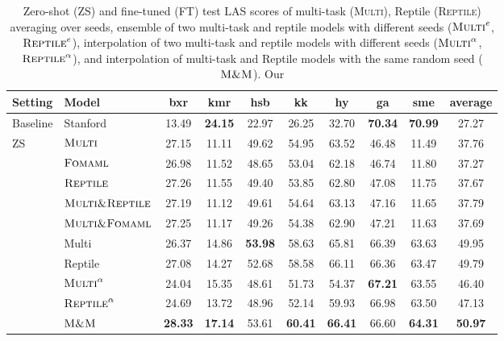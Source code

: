 \begin{table}[!ht]
    \fontsize{8}{10}\selectfont
    \begin{center}
    \setlength{\tabcolsep}{2pt}
    \begin{tabularx}{0.65\textwidth}{@{}l|lcccccccc@{}}
    \toprule
    Setting & Model                             &   bxr   &     kmr   &       hsb &        kk &    hy & ga    & sme   & average \\
    \midrule
    \multirow{ 1}{*}{Baseline} & \sc Stanford   &   13.49 &  \bf   24.15 &     22.97 &     26.25 &     32.70 &  \bf  70.34 &   \bf  70.99 &     27.27 \\
    \hline
    \multirow{ 7}{*}{ZS}
    & $\textsc{Multi}$ & 27.15 & 11.11 & 49.62 & 54.95 & 63.52 & 46.48 & 11.49 & 37.76 \\
    & $\textsc{Fomaml}$ & 26.98 & 11.52 & 48.65 & 53.04 & 62.18 & 46.74 & 11.80 & 37.27 \\
    & $\textsc{Reptile}$ & 27.26 & 11.55 & 49.40 & 53.85 & 62.80 & 47.08 & 11.75 & 37.67 \\
    & $\textsc{Multi\&Reptile}$ & 27.19 & 11.12 & 49.61 & 54.64 & 63.13 & 47.16 & 11.65 & 37.79 \\
    & $\textsc{Multi\&Fomaml}$ & 27.25 & 11.17 & 49.26 & 54.38 & 62.90 & 47.21 & 11.63 & 37.69 \\
    \hline
    \multirow{ 5}{*}{FT} &  \sc Multi                         &     26.37 &     14.86 & \bf 53.98 &     58.63 &     65.81 &     66.39 &     63.63 &     49.95 \\
    & \sc Reptile                       &     27.08 &     14.27 &     52.68 &     58.58 &     66.11 &     66.36 &     63.47 &     49.79 \\
    & $\textsc{Multi}^{\alpha}$              &     24.04 &     15.35 &     48.61 &     51.73 &     54.37 & \bf 67.21 &     63.55 &     46.40 \\
    & $\textsc{Reptile}^{\alpha}$            &     24.69 &     13.72 &     48.96 &     52.14 &     59.93 &     66.98 &     63.50 &     47.13 \\
    & $\textsc{M\&M}$                   & \bf 28.33 & \bf 17.14 &     53.61 & \bf 60.41 & \bf 66.41 &     66.60 & \bf 64.31 & \bf 50.97 \\
    \bottomrule
    \end{tabularx}
    \end{center}
    \caption{\label{table:las_all}
    Zero-shot (ZS) and fine-tuned (FT) test LAS scores of multi-task (\textsc{Multi}), Reptile (\textsc{Reptile}) averaging over seeds, ensemble of two multi-task and reptile models with different seeds ($\textsc{Multi}^{e}$, $\textsc{Reptile}^{e}$),  interpolation of two multi-task and reptile models with different seeds ($\textsc{Multi}^{\alpha}$, $\textsc{Reptile}^{\alpha}$), and interpolation of multi-task and Reptile models with the same random seed ($\textsc{M\&M}$). Our 
    }
\end{table}